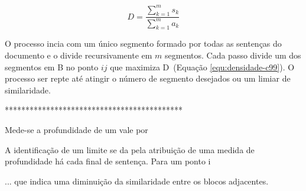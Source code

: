 \begin{equation}
D = \frac{\sum_{k=1}^m s_k}{\sum_{k=1}^m a_k}
\label{equ:densidade-c99}
\end{equation}


O processo incia com um único segmento formado por todas as sentenças do documento e o divide recursivamente em $m$ segmentos. Cada passo divide um dos segmentos em B no ponto $ij$ que maximiza D~(Equação \ref{equ:densidade-c99}). O processo ser repte até atingir o número de segmento desejados ou um limiar de similaridade.
 







*******************************************





Mede-se a profundidade de um vale por

A identificação de um limite se da pela atribuição de uma medida de profundidade há cada final de sentença. Para um ponto i 









... que indica uma diminuição da similaridade entre os blocos adjacentes. 














